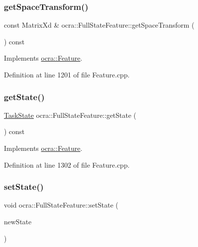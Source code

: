 \subsubsection{\texorpdfstring{get\+Space\+Transform()}{getSpaceTransform()}}
{\footnotesize\ttfamily const Matrix\+Xd \& ocra\+::\+Full\+State\+Feature\+::get\+Space\+Transform (\begin{DoxyParamCaption}{ }\end{DoxyParamCaption}) const\hspace{0.3cm}{\ttfamily [virtual]}}



Implements \hyperlink{classocra_1_1Feature_a77eb324fb4da91fd50d0e761d2453ff3}{ocra\+::\+Feature}.



Definition at line 1201 of file Feature.\+cpp.

\hypertarget{classocra_1_1FullStateFeature_aa0e23c8feabb2e6855404cd90032ffbc}{}\label{classocra_1_1FullStateFeature_aa0e23c8feabb2e6855404cd90032ffbc} 
\subsubsection{\texorpdfstring{get\+State()}{getState()}}
{\footnotesize\ttfamily \hyperlink{classocra_1_1TaskState}{Task\+State} ocra\+::\+Full\+State\+Feature\+::get\+State (\begin{DoxyParamCaption}{ }\end{DoxyParamCaption}) const\hspace{0.3cm}{\ttfamily [virtual]}}



Implements \hyperlink{classocra_1_1Feature_a792434ceb793f25874b8fe42ae24c475}{ocra\+::\+Feature}.



Definition at line 1302 of file Feature.\+cpp.

\hypertarget{classocra_1_1FullStateFeature_a77263aff16d7078ac19dc2eb6a196a65}{}\label{classocra_1_1FullStateFeature_a77263aff16d7078ac19dc2eb6a196a65} 
\subsubsection{\texorpdfstring{set\+State()}{setState()}}
{\footnotesize\ttfamily void ocra\+::\+Full\+State\+Feature\+::set\+State (\begin{DoxyParamCaption}\item[{const \hyperlink{classocra_1_1TaskState}{Task\+State} \&}]{new\+State }\end{DoxyParamCaption})\hspace{0.3cm}{\ttfamily [virtual]}}



